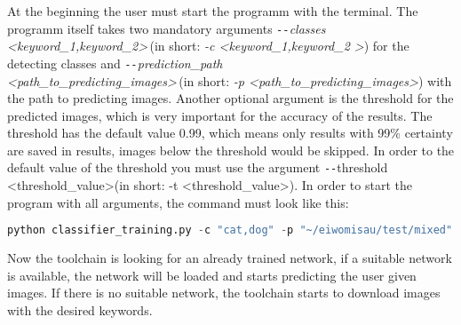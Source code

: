 \documentclass[../ImageClassifier.tex]{subfiles}
\begin{document}
    At the beginning the user must start the programm with the terminal.
    The programm itself takes two mandatory arguments \flqq\textit{\texttt{-{}-}classes \textless keyword\_1,keyword\_2\textgreater\frqq}\,(in short: \textit{\flqq -c \textless keyword\_1,keyword\_2 \textgreater \frqq}) for the detecting classes and \flqq\textit{\texttt{-{}-}prediction\_path\\ \textless path\_to\_predicting\_images\textgreater \frqq}\,(in short: \textit{\flqq -p \textless path\_to\_predicting\_images\textgreater \frqq}) with the path to predicting images.
    Another optional argument is the threshold for the predicted images, which is very important for the accuracy of the results.
    The threshold has the default value 0.99, which means only results with 99\% certainty are saved in results, images below the threshold would be skipped.
    In order to the default value of the threshold you must use the argument \flqq \texttt{-{}-}threshold \textless threshold\_value\textgreater\frqq (in short: \flqq -t \textless threshold\_value\textgreater\frqq).
    In order to start the program with all arguments, the command must look like this:
    \begin{lstlisting}[language=python, title={Launch of the toolchain}]
        python classifier_training.py -c "cat,dog" -p "~/eiwomisau/test/mixed" -t 0.98\end{lstlisting}
    Now the toolchain is looking for an already trained network, if a suitable network is available, the network will be loaded and starts predicting the user given images.
    If there is no suitable network, the toolchain starts to download images with the desired keywords.
\end{document}
